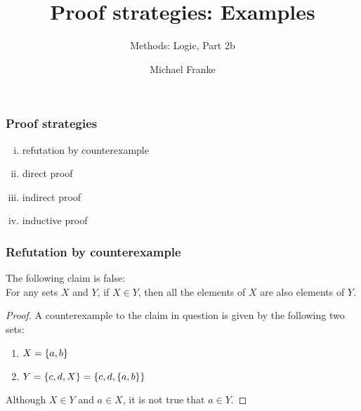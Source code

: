 \documentclass[fleqn,10pt,serif,xcolor=svgnames,xcolor=table,aspectratio=169,handout]{beamer}
\title{Proof strategies: Examples}
\subtitle{Methods: Logic, Part 2b}
\author{Michael Franke}
\date{}
\begin{document}

\abovedisplayskip=3pt
\abovedisplayshortskip=3pt

\belowdisplayskip=3pt
\belowdisplayshortskip=3pt

\begin{frame}
  \maketitle
\end{frame}

\begin{frame}
  \frametitle{Proof strategies}

  \begin{enumerate}[(i)]
    \item refutation by counterexample
    \item direct proof
    \item indirect proof
    \item inductive proof
  \end{enumerate}

\end{frame}

\begin{frame}
  \frametitle{Refutation by counterexample}

  \begin{mfproposition}
    \label{prop:refut-count-1}
    The following claim is false: \\
    For any sets $X$ and $Y$, if $X \in Y$, then all the elements of $X$ are also elements of $Y$.
  \end{mfproposition}

  \pause

  \begin{proof}
    A counterexample to the claim in question is given by the following two sets:
    \begin{enumerate}[]
      \item $X = \left\{a,b\right\}$
      \item $Y = \left\{c, d, X\right\} = \left\{c, d, \left\{a,b\right\}\right\}$
    \end{enumerate}
    Although $X \in Y$ and $a \in X$, it is not true that $a \in Y$.
  \end{proof}
\end{frame}
\end{document}
